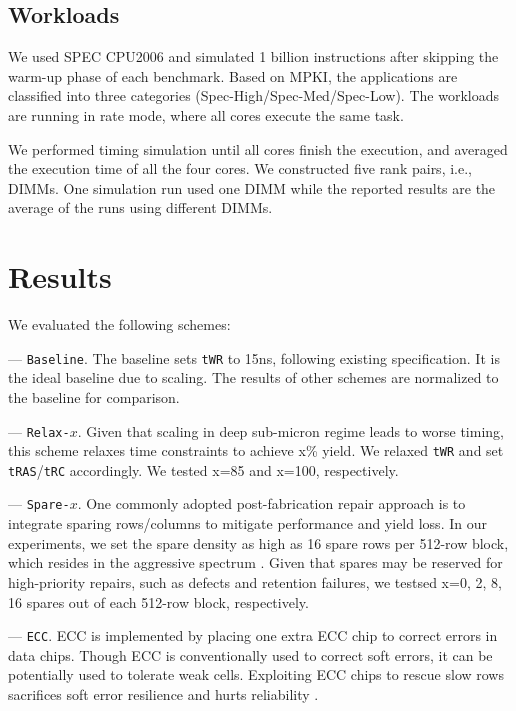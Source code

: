 \subsection{Workloads}
We used SPEC CPU2006 and simulated 1 billion instructions after skipping the warm-up phase of each benchmark. 
Based on MPKI, the applications are classified into three categories (Spec-High/Spec-Med/Spec-Low).%
The workloads are running in rate mode, where all cores execute the same task.

We performed timing simulation until all cores finish the execution, and averaged the execution time of all the four cores. We constructed five rank pairs, i.e., DIMMs. One simulation run used one DIMM while the reported results are the average of the runs using different DIMMs.

\section{Results}
We evaluated the following schemes:

--- \texttt{Baseline}. The baseline sets {\tt tWR} to 15ns, following existing specification. It is the ideal baseline due to scaling. The results of other schemes are normalized to the baseline for comparison.

--- \texttt{Relax-}$x$. Given that scaling in deep sub-micron regime leads to worse timing, this scheme relaxes time constraints to achieve x\% yield. We relaxed {\tt tWR} and set {\tt tRAS}/{\tt tRC} accordingly. We tested x=85 and x=100, respectively.

--- \texttt{Spare-}$x$. One commonly adopted post-fabrication repair approach is to integrate sparing rows/columns \cite{BOOK:jacob} to mitigate performance and yield loss. 
In our experiments, we set the spare density as high as 16 spare rows per 512-row block, which resides in the aggressive spectrum \cite{BOOK:fault,SSC96:spare}. Given that spares may be reserved for high-priority repairs, such as defects and retention failures, we testsed x=0, 2, 8, 16 spares out of each 512-row block, respectively. 

--- \texttt{ECC}. ECC is implemented by placing one extra ECC chip to correct errors in data chips. Though ECC is conventionally used to correct soft errors, it can be potentially used to tolerate weak cells. Exploiting ECC chips to rescue slow rows sacrifices soft error resilience and hurts reliability \cite{DFT05:ecc}.  

